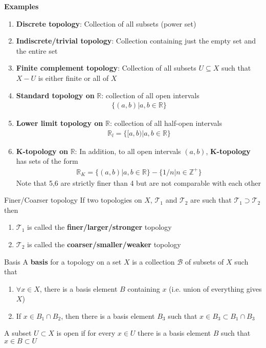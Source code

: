 \documentclass[titlepage, 12pt]{book}
\begin{document}
\textbf{Examples}
\begin{enumerate}
    \item\textbf{Discrete topology}: Collection of all subsets (power set)
    \item\textbf{Indiscrete/trivial topology}: Collection containing just the
        empty set and the entire set
    \item\textbf{Finite complement topology}: Collection of all subsets
        $U\subseteq X$ such that $X - U$ is either finite or all of $X$
    \item\textbf{Standard topology on }$\mathbb{R}$: collection of all open
        intervals
        \begin{gather*}
        \{(a, b)|a, b\in\mathbb{R}\}
        \end{gather*}
    \item\textbf{Lower limit topology on }$\mathbb{R}$: collection of all
        half-open intervals
        \begin{gather*}
            \mathbb{R}_l = \{[a, b)|a, b\in\mathbb{R}\}
        \end{gather*}
    \item\textbf{K-topology on }$\mathbb{R}$:
        In addition, to all open intervals $(a, b)$, \textbf{K-topology} has
        sets of the form
        \begin{gather*}
           \mathbb{R}_K = \{(a, b)|a, b\in\mathbb{R}\} - \{1/n | n\in\mathbb{Z}^+\}
        \end{gather*}
        Note that 5,6 are strictly finer than 4 but are not comparable with each
        other
\end{enumerate}

\begin{definition}{Finer/Coarser topology}{}
    If two topologies on $X$, $\mathcal{T}_1$ and $\mathcal{T}_2$ are such that
    $\mathcal{T}_1\supset\mathcal{T}_2$ then
    \begin{enumerate}
        \item $\mathcal{T}_1$ is called the \textbf{finer/larger/stronger} topology
        \item $\mathcal{T}_2$ is called the \textbf{coarser/smaller/weaker} topology
    \end{enumerate}
\end{definition}

\begin{definition}{Basis}{}
    A \textbf{basis} for a topology on a set $X$ is a collection $\mathcal{B}$
    of subsets of $X$ such that
    \begin{enumerate}
        \item $\forall x\in X$, there is a basis element $B$ containing $x$
            (i.e. union of everything gives $X$)
        \item If $x\in B_1\cap B_2$, then there is a basis element $B_3$ such
            that $x\in B_3\subset B_1\cap B_3$
    \end{enumerate}
    A subset $U\subset X$ is open if for every $x\in U$ there is a basis
    element $B$ such that $x\in B\subset U$
\end{definition}
\end{document}
